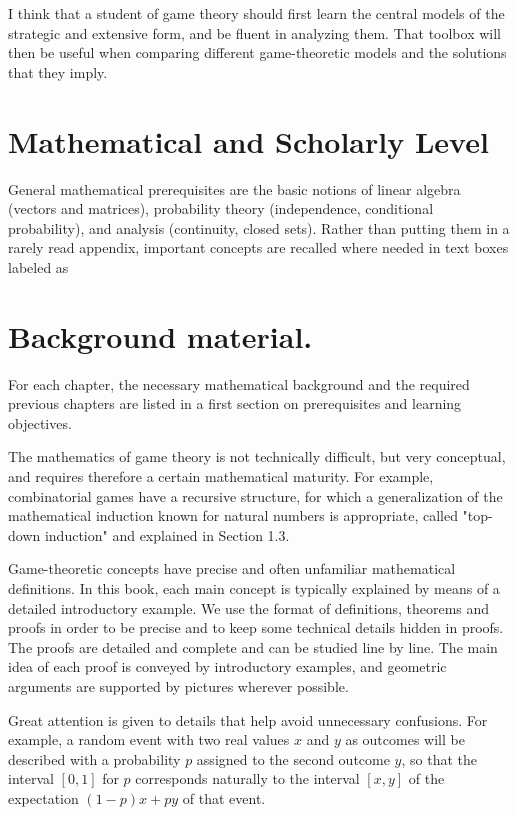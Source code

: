 \documentclass[12pt]{article}
\begin{document}
I think that a student of game theory should first learn the central models of the strategic and extensive form, and be fluent in analyzing them. That toolbox will then be useful when comparing different game-theoretic models and the solutions that they imply.

\section*{Mathematical and Scholarly Level}
General mathematical prerequisites are the basic notions of linear algebra (vectors and matrices), probability theory (independence, conditional probability), and analysis (continuity, closed sets). Rather than putting them in a rarely read appendix, important concepts are recalled where needed in text boxes labeled as

\section*{Background material.}
For each chapter, the necessary mathematical background and the required previous chapters are listed in a first section on prerequisites and learning objectives.

The mathematics of game theory is not technically difficult, but very conceptual, and requires therefore a certain mathematical maturity. For example, combinatorial games have a recursive structure, for which a generalization of the mathematical induction known for natural numbers is appropriate, called "top-down induction" and explained in Section 1.3.

Game-theoretic concepts have precise and often unfamiliar mathematical definitions. In this book, each main concept is typically explained by means of a detailed introductory example. We use the format of definitions, theorems and proofs in order to be precise and to keep some technical details hidden in proofs. The proofs are detailed and complete and can be studied line by line. The main idea of each proof is conveyed by introductory examples, and geometric arguments are supported by pictures wherever possible.

Great attention is given to details that help avoid unnecessary confusions. For example, a random event with two real values $x$ and $y$ as outcomes will be described with a probability $p$ assigned to the second outcome $y$, so that the interval $[0,1]$ for $p$ corresponds naturally to the interval $[x, y]$ of the expectation $(1-p) x+p y$ of that event.
\end{document}
